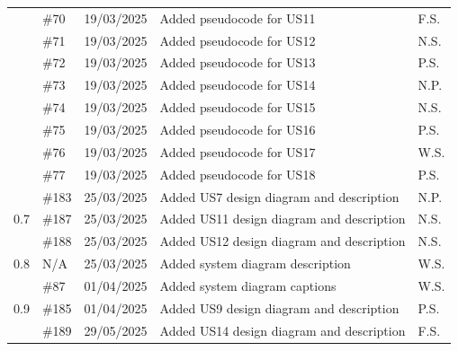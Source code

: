 \documentclass[a4paper]{project}
\begin{document}
\begin{center}
\begin{tabular}{|l|l|l|l|l|}
				                      & \#70      & 19/03/2025                  & Added pseudocode for US11                 & F.S.                   \\
				                      & \#71      & 19/03/2025                  & Added pseudocode for US12                 & N.S.                   \\
				                      & \#72      & 19/03/2025                  & Added pseudocode for US13                 & P.S.                   \\
				                      & \#73      & 19/03/2025                  & Added pseudocode for US14                 & N.P.                   \\
				                      & \#74      & 19/03/2025                  & Added pseudocode for US15                 & N.S.                   \\
				                      & \#75      & 19/03/2025                  & Added pseudocode for US16                 & P.S.                   \\
				                      & \#76      & 19/03/2025                  & Added pseudocode for US17                 & W.S.                   \\
				                      & \#77      & 19/03/2025                  & Added pseudocode for US18                 & P.S.                   \\ \hline
				\multirow{3}{*}{0.7}  & \#183     & 25/03/2025                  & Added US7 design diagram and description  & N.P.                   \\
				                      & \#187     & 25/03/2025                  & Added US11 design diagram and description & N.S.                   \\
				                      & \#188     & 25/03/2025                  & Added US12 design diagram and description & N.S.                   \\ \hline
				0.8                   & N/A       & 25/03/2025                  & Added system diagram description          & W.S.                   \\ \hline
				\multirow{9}{*}{0.9}  & \#87      & 01/04/2025                  & Added system diagram captions             & W.S.                   \\
				                      & \#185     & 01/04/2025                  & Added US9 design diagram and description  & P.S.                   \\
				                      & \#189     & 29/05/2025                  & Added US14 design diagram and description & F.S.                   \\

\end{tabular}
\end{center}
\end{document}
